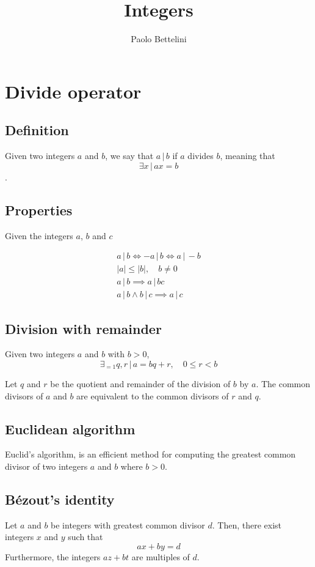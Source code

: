 \documentclass[a4paper]{article}
\title{Integers}
\author{Paolo Bettelini}
\date{}
\newcommand{\divides}{\,|\,}
\begin{document}
\maketitle
\tableofcontents
\pagebreak

\section{Divide operator}

\subsection{Definition}

Given two integers \(a\) and \(b\),
we say that \(a \divides b\) if \(a\) divides \(b\),
meaning that
\[
    \exists x \,|\, ax = b
\].

\subsection{Properties}

Given the integers \(a\), \(b\) and \(c\)

\begin{align*}
    a \divides b \iff -a \divides b \iff a \divides -b \\
    |a| \leq |b|, \quad b \neq 0 \\
    a \divides b \implies a \divides bc \\
    a \divides b \land b \divides c \implies a \divides c
\end{align*}

\subsection{Division with remainder}

Given two integers \(a\) and \(b\) with \(b > 0\),
\[
    \exists_{=1} q,r \,|\, a=bq+r, \quad 0 \leq r < b
\]


Let \(q\) and \(r\) be the quotient and remainder of the division of \(b\)
by \(a\).
The common divisors of \(a\) and \(b\) are equivalent to the common divisors of \(r\) and \(q\).


\subsection{Euclidean algorithm}

Euclid's algorithm, is an efficient method for computing the greatest common divisor of two integers
\(a\) and \(b\) where \(b > 0\).

\subsection{Bézout's identity}

Let \(a\) and \(b\) be integers with greatest common divisor \(d\).
Then, there exist integers \(x\) and \(y\) such that
\[
    ax+by=d
\]
Furthermore, the integers \(az+bt\) are multiples of \(d\).

\pagebreak
\end{document}
